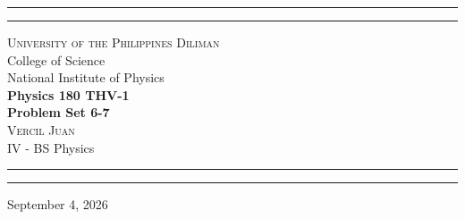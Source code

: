 \begin{titlepage}
    \vspace*{2.5in}
    \hrule
    \vspace{3pt}
    \hrule
    \vspace{0.25in}
    \begin{center}
		{
			\Large 
			\textsc{
				University of the Philippines Diliman
			}
			\\[4pt]
			College of Science
			\\[4pt]
			National Institute of Physics
		}
		\\[0.5cm]
		{
			\Huge
			\textbf{
				Physics 180 THV-1
				\\[5pt]
				Problem Set 6-7
			}
		}
		\\[0.75cm]
		{
			\Large 
			\textsc{
				Vercil Juan
			}
		}\\[5pt] 
		{
			\large 
			IV - BS Physics
		}
    \end{center}
    \vspace{0.25in}
    \hrule
    \vspace{3pt}
    \hrule 
    \vfill
    \begin{center}
    {\large 
		September 4, 2026
	}
    \end{center}
\end{titlepage}
